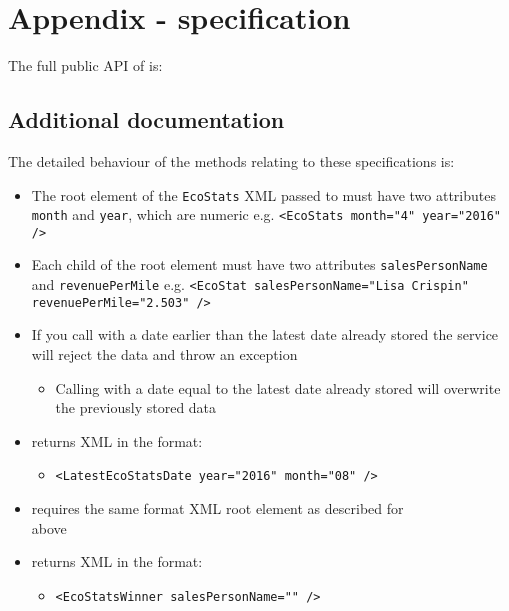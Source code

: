 \chapter*{Appendix - \texttt{\ShoutyStatsService} specification}

\label{service-spec}


The full public API of \texttt{\ShoutyStatsService} is:



\section*{Additional documentation}
The detailed behaviour of the methods relating to these specifications is:

\begin{itemize}
    \item The root element of the \texttt{EcoStats} XML passed to \texttt{\SetEcoStatsMethod} must have two attributes \texttt{month} and \texttt{year}, which are numeric e.g. \texttt{<EcoStats month="4" year="2016" />}
    
    \item Each child of the root element must have two attributes \texttt{salesPersonName} and \texttt{revenuePerMile} e.g. \texttt{<EcoStat salesPersonName="Lisa Crispin" revenuePerMile="2.503" />}
    
    \item If you call \texttt{\SetEcoStatsMethod} with a date earlier than the latest date already stored the service will reject the data and throw an exception
    \begin{itemize}
        \item Calling \texttt{\SetEcoStatsMethod} with a date equal to the latest date already stored will overwrite the previously stored data
    \end{itemize}
    
    \item \texttt{\GetLatestEcoStatsDateMethod} returns XML in the format:
    \begin{itemize}
        \item \texttt{<LatestEcoStatsDate year="2016" month="08" />}        
    \end{itemize}

    \item \texttt{\GetEcoStatsWinnerForMethod} requires the same format XML root element as described for\\ \texttt{\SetEcoStatsMethod} above

    \item \texttt{\GetEcoStatsWinnerForMethod} returns XML in the format:
    \begin{itemize}
        \item  \texttt{<EcoStatsWinner salesPersonName="" />}
    \end{itemize}
\end{itemize}